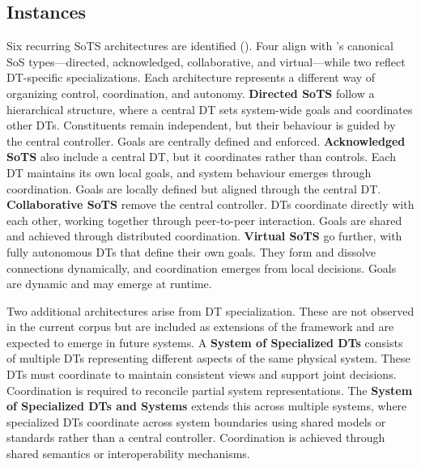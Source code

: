 \subsection{Instances}

Six recurring SoTS architectures are identified (). Four align with \citet{maier1998architecting}'s canonical SoS types---directed, acknowledged, collaborative, and virtual---while two reflect DT-specific specializations. Each architecture represents a different way of organizing control, coordination, and autonomy. \textbf{Directed SoTS} follow a hierarchical structure, where a central DT sets system-wide goals and coordinates other DTs. Constituents remain independent, but their behaviour is guided by the central controller. Goals are centrally defined and enforced. \textbf{Acknowledged SoTS} also include a central DT, but it coordinates rather than controls. Each DT maintains its own local goals, and system behaviour emerges through coordination. Goals are locally defined but aligned through the central DT. \textbf{Collaborative SoTS} remove the central controller. DTs coordinate directly with each other, working together through peer-to-peer interaction. Goals are shared and achieved through distributed coordination. \textbf{Virtual SoTS} go further, with fully autonomous DTs that define their own goals. They form and dissolve connections dynamically, and coordination emerges from local decisions. Goals are dynamic and may emerge at runtime.

Two additional architectures arise from DT specialization. These are not observed in the current corpus but are included as extensions of the framework and are expected to emerge in future systems. A \textbf{System of Specialized DTs} consists of multiple DTs representing different aspects of the same physical system. These DTs must coordinate to maintain consistent views and support joint decisions. Coordination is required to reconcile partial system representations. The \textbf{System of Specialized DTs and Systems} extends this across multiple systems, where specialized DTs coordinate across system boundaries using shared models or standards rather than a central controller. Coordination is achieved through shared semantics or interoperability mechanisms.